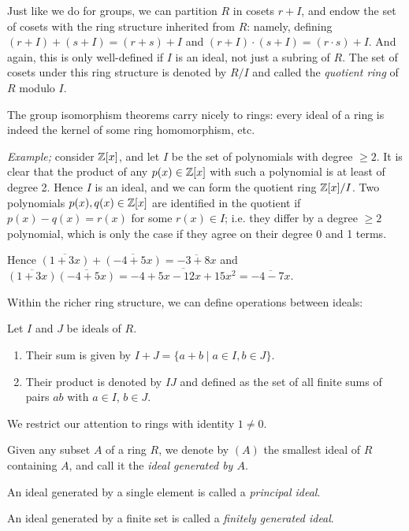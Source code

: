 Just like we do for groups, we can partition $R$ in cosets $r+I$, and endow the set of cosets with the ring structure inherited from $R$: namely, defining $(r+I)+(s+I)=(r+s)+I$ and $(r+I)\cdot (s+I) = (r\cdot s) + I$. And again, this is only well-defined if $I$ is an ideal, not just a subring of $R$. The set of cosets under this ring structure is denoted by $R/I$ and called the \emph{quotient ring} of $R$ modulo $I$.

The group isomorphism theorems carry nicely to rings: every ideal of a ring is indeed the kernel of some ring homomorphism, etc.

\emph{Example;} consider $\mathbb{Z}[x]$, and let $I$ be the set of polynomials with degree $\geq 2$. It is clear that the product of any $p(x)\in\mathbb{Z}[x]$ with such a polynomial is at least of degree 2. Hence $I$ is an ideal, and we can form the quotient ring $\mathbb{Z}[x]/I$. Two polynomials $p(x),q(x)\in\mathbb{Z}[x]$ are identified in the quotient if $p(x)-q(x)=r(x)$ for some $r(x)\in I$; i.e. they differ by a degree $\geq 2$ polynomial, which is only the case if they agree on their degree 0 and 1 terms.

Hence $\overline{(1+3x)}+\overline{(-4+5x)}=\overline{-3+8x}$ and $\overline{(1+3x)}\overline{(-4+5x)}=\overline{-4+5x-12x+15x^2}=\overline{-4-7x}$.

Within the richer ring structure, we can define operations between ideals:

\begin{defn}
	Let $I$ and $J$ be ideals of $R$.
	\begin{enumerate}[(1)]
		\item Their sum is given by $I+J=\{a+b \mid a\in I, b\in J\}$.
		\item Their product is denoted by $IJ$ and defined as the set of all finite sums of pairs $ab$ with $a\in I$, $b\in J$.
	\end{enumerate}
\end{defn}

We restrict our attention to rings with identity $1\neq 0$.

\begin{defn}
	Given any subset $A$ of a ring $R$, we denote by $(A)$ the smallest ideal of $R$ containing $A$, and call it the \emph{ideal generated by $A$}.

	An ideal generated by a single element is called a \emph{principal ideal}.

	An ideal generated by a finite set is called a \emph{finitely generated ideal}.
\end{defn}

